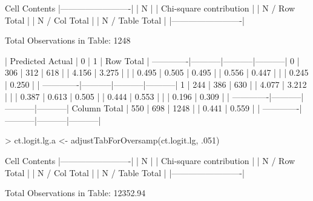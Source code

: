 \documentclass{article}
\begin{document}
\begin{Schunk}
\begin{Soutput}
   Cell Contents
|-------------------------|
|                       N |
| Chi-square contribution |
|           N / Row Total |
|           N / Col Total |
|         N / Table Total |
|-------------------------|

 
Total Observations in Table:  1248 

 
             | Predicted 
      Actual |         0 |         1 | Row Total | 
-------------|-----------|-----------|-----------|
           0 |       306 |       312 |       618 | 
             |     4.156 |     3.275 |           | 
             |     0.495 |     0.505 |     0.495 | 
             |     0.556 |     0.447 |           | 
             |     0.245 |     0.250 |           | 
-------------|-----------|-----------|-----------|
           1 |       244 |       386 |       630 | 
             |     4.077 |     3.212 |           | 
             |     0.387 |     0.613 |     0.505 | 
             |     0.444 |     0.553 |           | 
             |     0.196 |     0.309 |           | 
-------------|-----------|-----------|-----------|
Column Total |       550 |       698 |      1248 | 
             |     0.441 |     0.559 |           | 
-------------|-----------|-----------|-----------|
\end{Soutput}
\begin{Sinput}
> ct.logit.lg.a <- adjustTabForOversamp(ct.logit.lg, .051)
\end{Sinput}
\begin{Soutput}
   Cell Contents
|-------------------------|
|                       N |
| Chi-square contribution |
|           N / Row Total |
|           N / Col Total |
|         N / Table Total |
|-------------------------|

 
Total Observations in Table:  12352.94 


\end{Soutput}
\end{Schunk}
\end{document}
